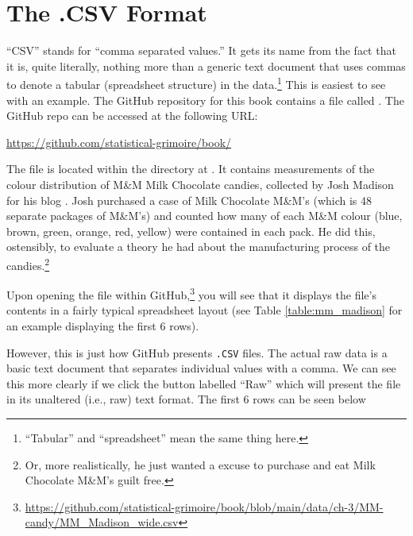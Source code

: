 \section{The .CSV Format}

``CSV'' stands for ``comma separated values.'' It gets its name from the fact that it is, quite literally, nothing more than a generic text document that uses commas to denote a tabular (spreadsheet structure) in the data.\footnote{``Tabular'' and ``spreadsheet'' mean the same thing here.} This is easiest to see with an example. The GitHub repository for this book contains a file called . The GitHub repo can be accessed at the following URL: 

\begin{center}
\url{https://github.com/statistical-grimoire/book/}
\end{center}

\noindent
The file is located within the  directory at . It contains measurements of the colour distribution of M\&M Milk Chocolate candies, collected by Josh Madison for his blog \parencite{Madison2007}. Josh purchased a case of Milk Chocolate M\&M's (which is 48 separate packages of M\&M's) and counted how many of each M\&M colour (blue, brown, green, orange, red, yellow) were contained in each pack. He did this, ostensibly, to evaluate a theory he had about the manufacturing process of the candies.\footnote{Or, more realistically, he just wanted a excuse to purchase and eat Milk Chocolate M\&M's guilt free.}

Upon opening the file within GitHub,\footnote{\url{https://github.com/statistical-grimoire/book/blob/main/data/ch-3/MM-candy/MM_Madison_wide.csv}} you will see that it displays the file's contents in a fairly typical spreadsheet layout (see Table \ref{table:mm_madison} for an example displaying the first 6 rows).

\vspace{1em}



\vspace{1em}

\noindent
However, this is just how GitHub presents \texttt{.CSV} files. The actual raw data is a basic text document that separates individual values with a comma. We can see this more clearly if we click the button labelled ``Raw'' which will present the file in its unaltered (i.e., raw) text format. The first 6 rows can be seen below

